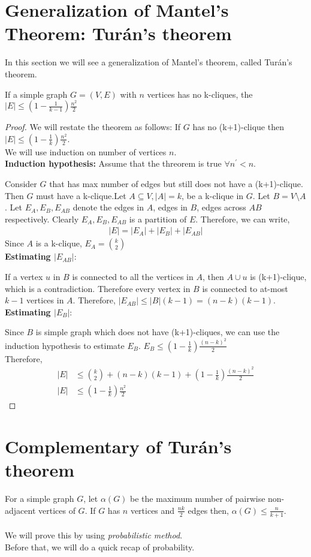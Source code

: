\section{Generalization of Mantel's Theorem: Tur\'an’s theorem}
In this section we will see a generalization of Mantel's theorem, called Tur\'an’s theorem.
\begin{theorem}
If a simple graph $G=(V,E)$ with $n$ vertices has no k-cliques, the $|E|\le (1-\frac{1}{k-1})\frac{n^2}{2}$
\end{theorem}
\begin{proof}
We will restate the theorem as follows: If $G$ has no (k+1)-clique then $|E|\le (1-\frac{1}{k})\frac{n^2}{2}$.\\
We will use induction on number of vertices $n$.\\
\textbf{Induction hypothesis:} Assume that the threorem is true $\forall n^{'} < n$.

Consider $G$ that has max number of edges but still does not have a (k+1)-clique. Then $G$ must have a k-clique.Let $A\subseteq V, |A|=k$, be a k-clique in $G$. Let $B=V\setminus A$.
Let $E_A, E_B, E_{AB}$ denote the edges in $A$, edges in $B$, edges across $AB$ respectively. Clearly $E_A, E_B, E_{AB}$ is a partition of $E$. Therefore, we can write,
\begin{align*}
    |E| = |E_A|+|E_B|+|E_{AB}|
\end{align*}
Since $A$ is a k-clique, $E_A= \binom{k}{2}$\\
\textbf{Estimating $|E_{AB}|$}: 

If a vertex $u$ in $B$ is connected to all the vertices in $A$, then $A \cup u$ is (k+1)-clique, which is a contradiction. Therefore every vertex in $B$ is connected to at-most $k-1$ vertices in $A$. Therefore, $|E_{AB}|\le |B|(k-1)=(n-k)(k-1)$.\\
\textbf{Estimating $|E_{B}|$}: 

Since $B$ is simple graph which does not have (k+1)-cliques, we can use the induction hypothesis to estimate $E_B$.
$E_B \le (1-\frac{1}{k})\frac{(n-k)^2}{2}$\\
Therefore,
\begin{align*}
    |E| &\le \binom{k}{2} + (n-k)(k-1) + (1-\frac{1}{k})\frac{(n-k)^2}{2}\\
    |E| &\le (1-\frac{1}{k})\frac{n^2}{2}
\end{align*}

\end{proof}

\section{Complementary of Tur\'an’s theorem}
For a simple graph $G$, let $\alpha(G)$ be the maximum number of pairwise non-adjacent vertices of $G$. If $G$ has $n$ vertices and $\frac{nk}{2}$ edges then,
$\alpha(G) \le \frac{n}{k+1}$.\\\\
We will prove this by using \textit{probabilistic method}.\\
Before that, we will do a quick recap of probability.

